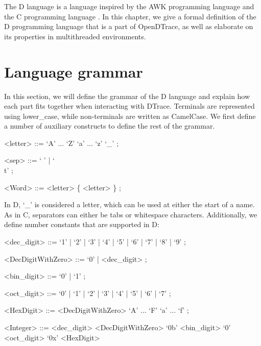 The D language is a language inspired by the AWK programming language
\cite{Aho:1987:APL:29361} and the C programming language
\cite{DTrace2004}\cite{Kernighan:1988}. In this chapter, we give a
formal definition of the D programming language that is a part of
OpenDTrace, as well as elaborate on its properties in multithreaded
environments.

\section{Language grammar}
\label{sec:grammar}

\setlength{\grammarparsep}{5pt plus 1pt minus 1pt} %
\setlength{\grammarindent}{12em} %

%



In this section, we will define the grammar of the D language and explain how
each part fits together when interacting with DTrace. Terminals are represented
using lower\_case, while non-terminals are written as CamelCase. We first define
a number of auxiliary constructs to define the rest of the grammar.

\begin{grammar}
<letter> ::= `A' ... `Z'
	\alt `a' ... `z'
	\alt `\_' ;

<sep> ::= ` ' | `\\t' ;

<Word> ::= <letter> \{ <letter> \} ;
\end{grammar}

\noindent
In D, `\_' is considered a letter, which can be used at either the start of a
name. As in C, separators can either be tabs or whitespace characters.
Additionally, we define number constants that are supported in D:

\begin{grammar}
<dec\_digit> ::= `1' | `2' | `3' | `4' | `5' | `6' | `7' | `8' | `9' ;

<DecDigitWithZero> ::= `0' | <dec\_digit> ;

<bin\_digit> ::= `0' | `1' ;

<oct\_digit> ::= `0' | `1' | `2' | `3' | `4' | `5' | `6' | `7' ;

<HexDigit> ::= <DecDigitWithZero>
	\alt `A' ... `F'
	\alt `a' ... `f' ;

<Integer> ::= <dec\_digit> <DecDigitWithZero>
	\alt `0b' <bin\_digit>
	\alt `0' <oct\_digit>
	\alt `0x' <HexDigit>
\end{grammar}

